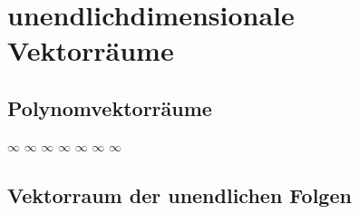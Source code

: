 \chapter{unendlichdimensionale Vektorräume}
\label{sec:unendliche VRs}

\section{Polynomvektorräume}
$\infty$ $\infty$ $\infty$ $\infty$ $\infty$ $\infty$ $\infty$

\section{Vektorraum der unendlichen Folgen}
